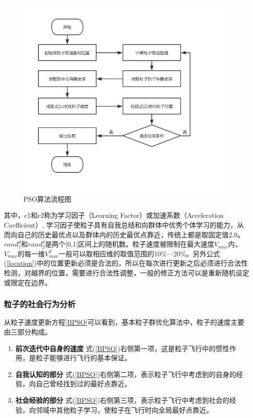 \begin{figure}[ht]
	\centering
	\includegraphics[width=\linewidth]{pic/PSO_flow}
	\caption{PSO算法流程图}
	
\end{figure}


其中，c1和c2称为学习因子（Learning Factor）或加速系数（Acceleration Coefficient）, 学习因子使粒子具有自我总结和向群体中优秀个体学习的能力，从而向自己的历史最优点以及群体内的历史最优点靠近，传统上都是取固定值2.0。${rand}_1^d$和${rand}_2^d$是两个[0,1]区间上的随机数。粒子速度被限制在最大速度$V_{max}$内，$V_{max}$的每一维$V_{max}^d$一般可以取相应维的取值范围的10\%—20\%。另外公式(\ref{location})中的位置更新必须是合法的，所以在每次进行更新之后必须进行合法性检测，对越界的位置，需要进行合法性调整，一般的修正方法可以是重新随机设定或限定在边界。

\subsubsection{粒子的社会行为分析}
从粒子速度更新方程\ref{BPSO}可以看到，基本粒子群优化算法中，粒子的速度主要由三部分构成。
\begin{enumerate}
	\item \textbf{前次迭代中自身的速度}
	\noindent 式(\ref{BPSO})右侧第一项，这是粒子飞行中的惯性作用，是粒子能够进行飞行的基本保证。
	
	\item \textbf{自我认知的部分}
	\noindent 式(\ref{BPSO})右侧第二项，表示粒子飞行中考虑到的自身的经验，向自己曾经找到过的最好点靠近。
	
	\item \textbf{社会经验的部分}
	\noindent 式(\ref{BPSO})右侧第三项，表示粒子飞行中考虑到社会的经验，向邻域中其他粒子学习，使粒子在飞行时向全局最好点靠近。
\end{enumerate}

